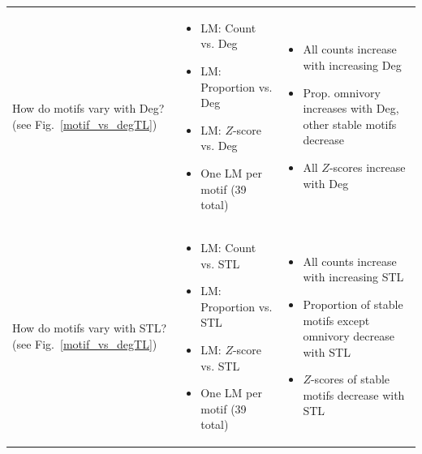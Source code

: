 \documentclass[12pt]{article}
\begin{document}
\begin{landscape}
\begin{table}[h!]
\begin{tabular}{m{6.5cm}|m{7cm}|m{8cm}}
        \hline
        How do motifs vary with Deg? \newline(see Fig.~\ref{motif_vs_degTL}) & \begin{itemize} 
        \item LM: Count vs. Deg 
        \item LM: Proportion vs. Deg 
        \item LM: $Z$-score vs. Deg 
        \item One LM per motif (39 total)
        \end{itemize} 
        & 
        \begin{itemize}
            \item All counts increase with increasing Deg
            \item Prop. omnivory increases with Deg, other stable motifs decrease
            \item All $Z$-scores increase with Deg \end{itemize}\\
        How do motifs vary with STL? \newline(see Fig.~\ref{motif_vs_degTL}) & \begin{itemize} 
        \item LM: Count vs. STL 
        \item LM: Proportion vs. STL 
        \item LM: $Z$-score vs. STL
        \item One LM per motif (39 total)
        \end{itemize} &
        \begin{itemize}
            \item All counts increase with increasing STL
            \item Proportion of stable motifs except omnivory decrease with STL
            \item $Z$-scores of stable motifs decrease with STL
        \end{itemize} \\
        \end{tabular}
    \end{table}
\end{landscape}

\clearpage
\end{document}
